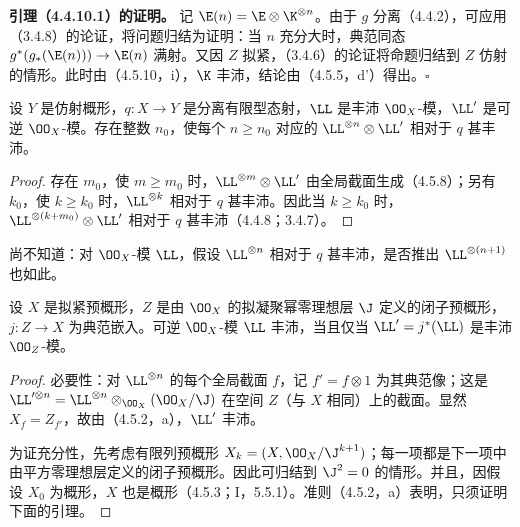 \textbf{引理（4.4.10.1）的证明。}
记 $\E(n)=\E\otimes\K^{\otimes n}$。由于 $g$ 分离（4.4.2），可应用（3.4.8）的论证，将问题归结为证明：当 $n$ 充分大时，典范同态
$g^*(g_*(\E(n)))\to\E(n)$ 满射。又因 $Z$ 拟紧，（3.4.6）的论证将命题归结到 $Z$ 仿射的情形。此时由（4.5.10，i），$\K$ 丰沛，结论由（4.5.5，d'）得出。\hfill$\square$

设 $Y$ 是仿射概形，$q:X\to Y$ 是分离有限型态射，$\LL$ 是丰沛 $\OO_X$-模，$\LL'$ 是可逆 $\OO_X$-模。存在整数 $n_0$，使每个 $n\geq n_0$ 对应的 $\LL^{\otimes n}\otimes\LL'$ 相对于 $q$ 甚丰沛。
\begin{proof}
存在 $m_0$，使 $m\geq m_0$ 时，$\LL^{\otimes m}\otimes\LL'$ 由全局截面生成（4.5.8）；另有 $k_0$，使 $k\geq k_0$ 时，$\LL^{\otimes k}$ 相对于 $q$ 甚丰沛。因此当 $k\geq k_0$ 时，$\LL^{\otimes(k+m_0)}\otimes\LL'$ 相对于 $q$ 甚丰沛（4.4.8；3.4.7）。
\end{proof}

尚不知道：对 $\OO_X$-模 $\LL$，假设 $\LL^{\otimes n}$ 相对于 $q$ 甚丰沛，是否推出 $\LL^{\otimes(n+1)}$ 也如此。

设 $X$ 是拟紧预概形，$Z$ 是由 $\OO_X$ 的拟凝聚幂零理想层 $\J$ 定义的闭子预概形，$j:Z\to X$ 为典范嵌入。可逆 $\OO_X$-模 $\LL$ 丰沛，当且仅当 $\LL'=j^*(\LL)$ 是丰沛 $\OO_Z$-模。
\begin{proof}
必要性：对 $\LL^{\otimes n}$ 的每个全局截面 $f$，记 $f'=f\otimes1$ 为其典范像；这是
$\LL'^{\otimes n}=\LL^{\otimes n}\otimes_{\OO_X}(\OO_X/\J)$ 在空间 $Z$（与 $X$ 相同）上的截面。显然 $X_f=Z_{f'}$，故由（4.5.2，a），$\LL'$ 丰沛。

为证充分性，先考虑有限列预概形 $X_k=(X,\OO_X/\J^{k+1})$；每一项都是下一项中由平方零理想层定义的闭子预概形。因此可归结到 $\J^2=0$ 的情形。并且，因假设 $X_0$ 为概形，$X$ 也是概形（4.5.3；I，5.5.1）。准则（4.5.2，a）表明，只须证明下面的引理。\renewcommand{\qedsymbol}{}
\end{proof}

